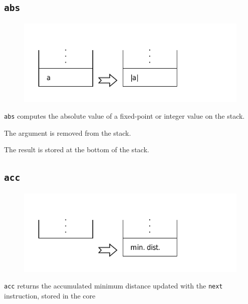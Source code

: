 	\subsection*{\texttt{abs}}
	
		\begin{figure}
			\begin{flushright}
				\includegraphics[width=\linewidth]{figure/pdf/i_abs} 
			\end{flushright}
		\end{figure}
	
			\texttt{abs} computes the absolute value of a fixed-point or
			integer value on the stack.
			
			The argument is removed from the stack.
			
			The result is stored at the bottom of the stack.
	
	\qquad
	
	\subsection*{\texttt{acc}}
	
		\begin{figure}
			\begin{flushright}
				\includegraphics[width=\linewidth]{figure/pdf/i_acc} 
			\end{flushright}
		\end{figure}
	
			\texttt{acc} returns the accumulated minimum distance updated with
			the \texttt{next} instruction, stored in the core
			
